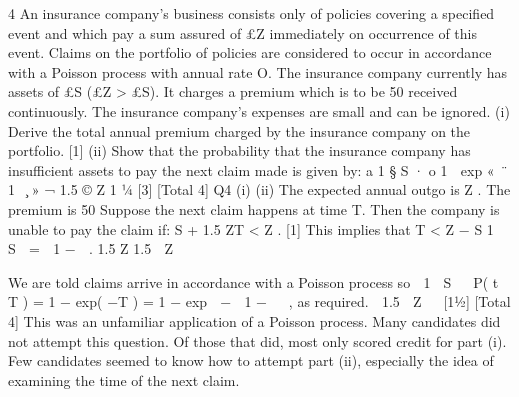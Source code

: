 4
An insurance company’s business consists only of policies covering a specified event
and which pay a sum assured of £Z immediately on occurrence of this event. Claims
on the portfolio of policies are considered to occur in accordance with a Poisson
process with annual rate O.
The insurance company currently has assets of £S (£Z > £S). It charges a premium
which is to be 50%
received continuously. The insurance company’s expenses are small and can be
ignored.
(i) Derive the total annual premium charged by the insurance company on the
portfolio.
[1]
(ii) Show that the probability that the insurance company has insufficient assets to
pay the next claim made is given by:
a 1 § S · o
1  exp « 
 ̈ 1   ̧ »
¬ 1.5 © Z 1 1⁄4
[3]
[Total 4]
Q4
(i)
(ii)
The expected annual outgo is \lambda Z . 
The premium is 50%
Suppose the next claim happens at time T.
Then the company is unable to pay the claim if:
S + 1.5 \lambda ZT < Z .
[1]
This implies that
T <
Z − S
1  S 
=
 1 −  .
1.5 \lambda Z 1.5 \lambda  Z 

We are told claims arrive in accordance with a Poisson process so
 1  S  
P( t \leq T ) = 1 − exp( −\lambda T ) = 1 − exp  −
 1 −   , as required.
 1.5  Z  
[11⁄2]
[Total 4]
This was an unfamiliar application of a Poisson process. Many candidates
did not attempt this question. Of those that did, most only scored credit for
part (i). Few candidates seemed to know how to attempt part (ii), especially
the idea of examining the time of the next claim.
